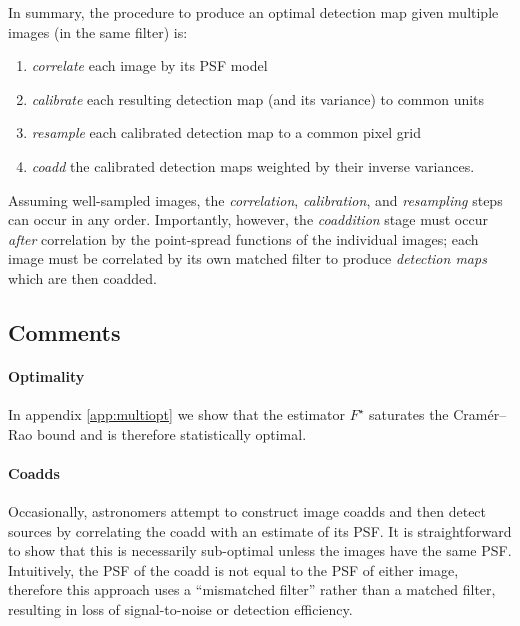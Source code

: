 \documentclass[11pt,letterpaper,linenumbers]{aastex63}
\begin{document}
In summary, the procedure to produce an optimal detection map given
multiple images (in the same filter) is:
\begin{enumerate}
\item \emph{correlate} each image by its PSF model
\item \emph{calibrate} each resulting detection map (and its variance)
  to common units
\item \emph{resample} each calibrated detection map to a common pixel
  grid
\item \emph{coadd} the calibrated detection maps weighted by their
  inverse variances.
\end{enumerate}
Assuming well-sampled images, the \emph{correlation},
\emph{calibration}, and \emph{resampling} steps can occur in any
order.  Importantly, however, the \emph{coaddition} stage must occur
\emph{after} correlation by the point-spread functions of the
individual images; each image must be correlated by its own matched
filter to produce \emph{detection maps} which are then coadded.

\subsection{Comments}

\paragraph{Optimality}
In appendix \ref{app:multiopt} we show that the estimator $F^{\star}$
saturates the Cram\'er--Rao bound and is therefore statistically
optimal.

\paragraph{Coadds}
Occasionally, astronomers attempt to construct image coadds and then
detect sources by correlating the coadd with an estimate of its PSF.
It is straightforward to show that this is necessarily sub-optimal
unless the images have the same PSF.  Intuitively, the PSF of the
coadd is not equal to the PSF of either image, therefore this approach
uses a ``mismatched filter'' rather than a matched filter, resulting
in loss of signal-to-noise or detection efficiency.
\end{document}
